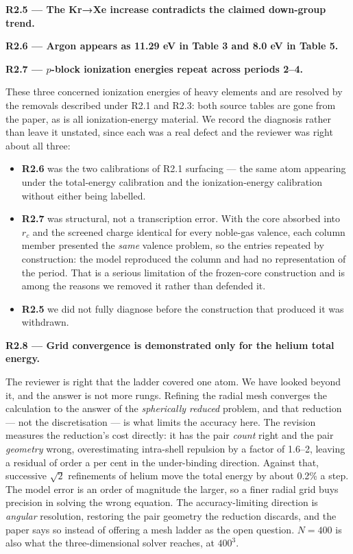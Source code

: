 \documentclass[11pt,a4paper]{article}
\begin{document}
\textbf{R2.5 --- The Kr→Xe increase contradicts the claimed down-group trend.}

\textbf{R2.6 --- Argon appears as 11.29 eV in Table 3 and 8.0 eV in Table 5.}

\textbf{R2.7 --- $p$-block ionization energies repeat across periods 2--4.}

These three concerned ionization energies of heavy elements and are resolved by the removals
described under R2.1 and R2.3: both source tables are gone from the paper, as is all
ionization-energy material. We record the diagnosis rather than leave it unstated, since each
was a real defect and the reviewer was right about all three:

\begin{itemize}
  \item \textbf{R2.6} was the two calibrations of R2.1 surfacing --- the same atom appearing under the
    total-energy calibration and the ionization-energy calibration without either being labelled.
  \item \textbf{R2.7} was structural, not a transcription error. With the core absorbed into $r_c$ and the
    screened charge identical for every noble-gas valence, each column member presented the \emph{same}
    valence problem, so the entries repeated by construction: the model reproduced the column and
    had no representation of the period. That is a serious limitation of the frozen-core
    construction and is among the reasons we removed it rather than defended it.
  \item \textbf{R2.5} we did not fully diagnose before the construction that produced it was withdrawn.
\end{itemize}

\textbf{R2.8 --- Grid convergence is demonstrated only for the helium total energy.}

The reviewer is right that the ladder covered one atom. We have looked beyond it, and the answer is
not more rungs. Refining the radial mesh converges the calculation to the answer of the \emph{spherically reduced} problem, and that reduction --- not the discretisation --- is what limits the accuracy here. The
revision measures the reduction's cost directly: it has the pair \emph{count} right and the pair
\emph{geometry} wrong, overestimating intra-shell repulsion by a factor of 1.6--2, leaving a residual of
order a per cent in the under-binding direction. Against that, successive $\sqrt2$ refinements of
helium move the total energy by about 0.2\% a step. The model error is an order of magnitude the
larger, so a finer radial grid buys precision in solving the wrong equation. The accuracy-limiting
direction is \emph{angular} resolution, restoring the pair geometry the reduction discards, and the paper
says so instead of offering a mesh ladder as the open question. $N=400$ is also what the
three-dimensional solver reaches, at $400^3$.
\end{document}
